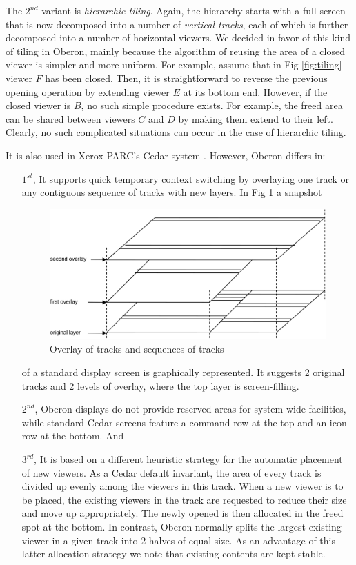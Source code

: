 The $2^{nd}$ variant is \emph{hierarchic tiling}. Again, the hierarchy starts with a full screen
that is now decomposed into a number of \emph{vertical tracks}, each of which is further
decomposed into a number of horizontal viewers. We decided in favor of this kind of tiling
in Oberon, mainly because the algorithm of reusing the area of a closed viewer is simpler
and more uniform. For example, assume that in Fig \ref{fig:tiling} viewer $F$ has been closed.
Then, it is straightforward to reverse the previous opening operation by extending viewer $E$
at its bottom end. However, if the closed viewer is $B$, no such simple procedure exists.
For example, the freed area can be shared between viewers $C$ and $D$ by making them extend
to their left. Clearly, no such complicated situations can occur in the case of hierarchic tiling.

It is also used in Xerox PARC's Cedar system \cite{Teitelman}. However, Oberon differs in:
\begin{itemize}
  \item[$1^{st}$,] It supports quick temporary context switching by overlaying one track or
    any contiguous sequence of tracks with new layers.  In Fig \ref{fig:overlay} a snapshot
    \begin{figure}[h!]
      \centering
      \includegraphics[width=.8\textwidth]{i/6}
      \caption{Overlay of tracks and sequences of tracks}
      \label{fig:overlay}
    \end{figure}
    of a standard display screen is graphically represented. It suggests 2 original tracks
    and 2 levels of overlay, where the top layer is screen-filling.

  \item[$2^{nd}$,] Oberon displays do not provide reserved areas for system-wide facilities, while
    standard Cedar screens feature a command row at the top and an icon row at the bottom. And

  \item[$3^{rd}$,] It is based on a different heuristic strategy for the automatic placement
    of new viewers. As a Cedar default invariant, the area of every track is divided up evenly
    among the viewers in this track. When a new viewer is to be placed, the existing viewers
    in the track are requested to reduce their size and move up appropriately. The newly opened
    is then allocated in the freed spot at the bottom. In contrast, Oberon normally splits
    the largest existing viewer in a given track into 2 halves of equal size. As an advantage
    of this latter allocation strategy we note that existing contents are kept stable.
\end{itemize}
